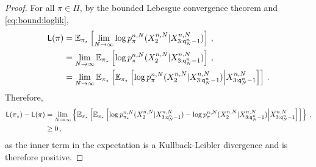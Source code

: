 \begin{proof}
For all $\pi\in\Pi$, by the bounded Lebesgue convergence theorem and \eqref{eq:bound:loglik},
\begin{align*}
\mathsf{L}(\pi) &= \mathbb{E}_{\pi_{\star}}\left[\lim_{N\to \infty}\log p_{\pi}^{n,N}(X_{2}^{n,N}|X_{3:{\mathsf{q}}^{n}_{N}-1}^{n,N})\right]\,,\\ 
&= \lim_{N\to \infty}\mathbb{E}_{\pi_{\star}}\left[\log p_{\pi}^{n,N}(X_{2}^{n,N}|X_{3:{\mathsf{q}}^{n}_{N}-1}^{n,N})\right]\,,\\
&= \lim_{N\to \infty}\mathbb{E}_{\pi_{\star}}\left[\mathbb{E}_{\pi_{\star}}\left[\log p_{\pi}^{n,N}(X_{2}^{n,N}|X_{3:{\mathsf{q}}^{n}_{N}-1}^{n,N})\middle|X_{3:{\mathsf{q}}^{n}_{N}-1}^{n,N}\right]\right]\,.
\end{align*}
Therefore, 
\begin{align*}
\mathsf{L}(\pi_{\star}) - \mathsf{L}(\pi) &=  \lim_{N\to \infty}\left\{\mathbb{E}_{\pi_{\star}}\left[\mathbb{E}_{\pi_{\star}}\left[\log p_{\pi_{\star}}^{n,N}(X_{2}^{n,N}|X_{3:{\mathsf{q}}^{n}_{N}-1}^{n,N}) - \log p_{\pi}^{n,N}(X_{2}^{n,N}|X_{3:{\mathsf{q}}^{n}_{N}-1}^{n,N})\middle|X_{3:{\mathsf{q}}^{n}_{N}-1}^{n,N}\right]\right]\right\}\,,\\
&\ge 0\,,
\end{align*}
as the inner term in the expectation is a Kullback-Leibler divergence and is therefore positive.
\end{proof}


